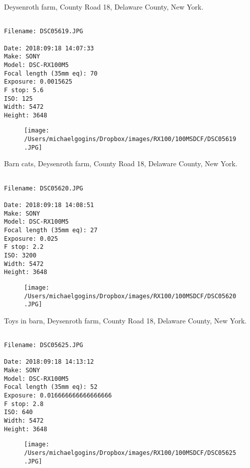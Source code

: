 \documentclass[11pt,letter,DIV=14,paper=landscape]{scrbook}
\begin{document}
\clearpage
\noindent Deysenroth farm, County Road 18, Delaware County, New York.
\noindent
\begin{lstlisting}

Filename: DSC05619.JPG

Date: 2018:09:18 14:07:33
Make: SONY
Model: DSC-RX100M5
Focal length (35mm eq): 70
Exposure: 0.0015625
F stop: 5.6
ISO: 125
Width: 5472
Height: 3648
\end{lstlisting}
\clearpage

\begin{figure}
\texttt{[image: /Users/michaelgogins/Dropbox/images/RX100/100MSDCF/DSC05619.JPG]}
\end{figure}
    
\clearpage
\noindent Barn cats, Deysenroth farm, County Road 18, Delaware County, New York.
\noindent
\begin{lstlisting}

Filename: DSC05620.JPG

Date: 2018:09:18 14:08:51
Make: SONY
Model: DSC-RX100M5
Focal length (35mm eq): 27
Exposure: 0.025
F stop: 2.2
ISO: 3200
Width: 5472
Height: 3648
\end{lstlisting}
\clearpage

\begin{figure}
\texttt{[image: /Users/michaelgogins/Dropbox/images/RX100/100MSDCF/DSC05620.JPG]}
\end{figure}
    
\clearpage
\noindent Toys in barn, Deysenroth farm, County Road 18, Delaware County, New York.
\noindent
\begin{lstlisting}

Filename: DSC05625.JPG

Date: 2018:09:18 14:13:12
Make: SONY
Model: DSC-RX100M5
Focal length (35mm eq): 52
Exposure: 0.016666666666666666
F stop: 2.8
ISO: 640
Width: 5472
Height: 3648
\end{lstlisting}
\clearpage

\begin{figure}
\texttt{[image: /Users/michaelgogins/Dropbox/images/RX100/100MSDCF/DSC05625.JPG]}
\end{figure}
    
\end{document}
